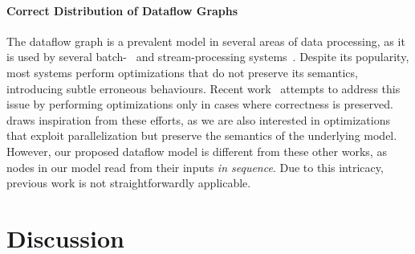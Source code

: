 \documentclass[sigplan,10pt,review,anonymous]{acmart}
\newcommand{\km}[1]{[{\color{blue}#1 --- km}]}
\begin{document}
\paragraph{Correct Distribution of Dataflow Graphs}
%
The dataflow graph is a prevalent model in several areas of data
processing, as it is used by several batch-~\cite{mapreduce:08,
  spark:12} and stream-processing systems~\cite{murray2013naiad,
  carbone2015flink}. Despite its popularity, most systems perform
optimizations that do not preserve its semantics, introducing subtle
erroneous behaviours. Recent work~\cite{HSSGG2014, SHGW2015,
  MSAIT2019} attempts to address this issue by performing
optimizations only in cases where correctness is preserved. \sys draws
inspiration from these efforts, as we are also interested in
optimizations that exploit parallelization but preserve the semantics
of the underlying model. However, our proposed dataflow model is
different from these other works, as nodes in our model read from
their inputs \emph{in sequence}. Due to this intricacy, previous work
is not straightforwardly applicable.


  

  


\section{Discussion}
\label{discussion}
\end{document}
